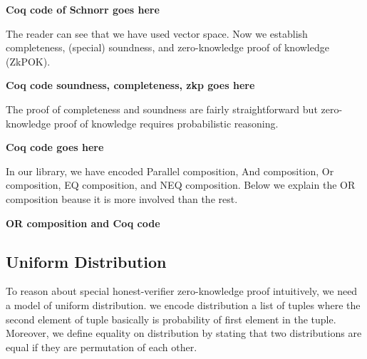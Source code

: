 \documentclass[conference,compsoc]{IEEEtran}
\begin{document}
  \textbf{Coq code of Schnorr goes here}
  

  The reader can see that we have used vector space. Now 
  we establish completeness, (special) soundness, and zero-knowledge 
  proof of knowledge (ZkPOK). 


  \textbf{Coq code soundness, completeness, zkp goes here}

  The proof of completeness and soundness are fairly straightforward but 
  zero-knowledge proof of knowledge requires probabilistic reasoning. 
  

  \textbf{Coq code goes here}
  

  In our library, we have encoded Parallel composition, 
  And composition, Or composition, EQ composition, and 
  NEQ composition. Below we explain the OR composition
  beause it is more involved than the rest. 
  
  \textbf{OR composition and Coq code}



  
  \subsection{Uniform Distribution}
  To reason about special honest-verifier zero-knowledge proof 
  intuitively, we need a model of uniform distribution. 
  we encode distribution a list of tuples where the 
  second element of tuple basically is probability of first element 
  in the tuple. Moreover, we define equality on distribution by 
  stating that two distributions are equal if they are permutation 
  of each other. 
\end{document}
